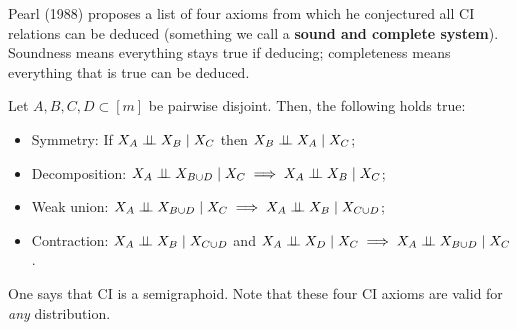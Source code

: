 Pearl (1988) proposes a list of four axioms from which he conjectured all CI relations can be deduced (something we call a \textbf{sound and complete system}). Soundness means everything stays true if deducing; completeness means everything that is true can be deduced. 

\begin{prop}
   Let \( A,B,C,D \subset [m] \) be pairwise disjoint. Then, the following holds true:
  \begin{itemize}
    \item Symmetry: If \( X_A \perp \!\!\! \perp X_B \mid X_C \) then \( X_B \perp \!\!\! \perp X_A \mid X_C \);
    \item Decomposition: \( X_A \perp \!\!\! \perp X_{B \cup D} \mid X_C \implies X_A \perp \!\!\! \perp X_B \mid X_C \);
    \item Weak union: \( X_A \perp \!\!\! \perp X_{B \cup D} \mid X_C \implies X_A \perp \!\!\! \perp X_B \mid X_{C \cup D} \);
    \item Contraction: \( X_A \perp \!\!\! \perp X_B \mid X_{C \cup D}  \) and \( X_A \perp \!\!\! \perp X_D \mid X_C \implies X_A \perp \!\!\! \perp X_{B \cup D} \mid X_C \).
  \end{itemize}
  One says that CI is a semigraphoid. Note that these four CI axioms are valid for \emph{any} distribution.
\end{prop}
